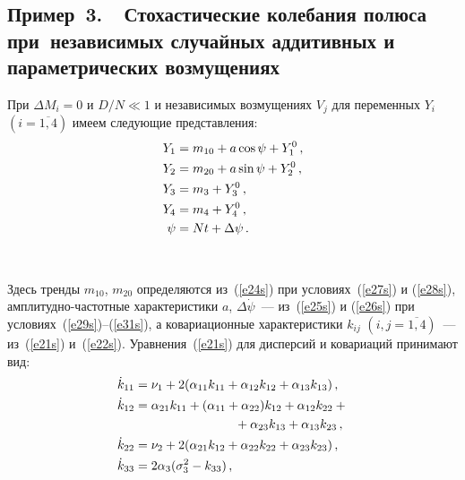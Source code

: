 \begin{multicols}{2}
\section{Пример~3.\ \ Стохастические колебания полюса при~независимых
случайных аддитивных и параметрических возмущениях}


При $\Delta M_i =0$ и $D/N \ll 1$ и независимых возмущениях
$V_j$ для переменных $Y_i$ $(i=\overline{1,4})$ имеем следующие
представления:
\begin{align}
Y_1 &= m_{10} + a \cos\psi + Y_1^0\,,\notag\\
Y_2 &= m_{20} + a \sin\psi + Y_2^0\,,\notag\\
Y_3 &= m_3 + Y_3^0\,,\notag\\
Y_4 &= m_4 + Y_4^0\,,\notag\\
\psi &= Nt +\Delta \psi\,.\label{e45s}
\end{align}
\begin{figure*} %
\vspace*{1pt}
\begin{center}
\mbox{%
\epsfxsize=164.416mm
}
\end{center}
\vspace*{-9pt}
\end{figure*}
Здесь тренды $m_{10}$, $m_{20}$ определяются из~(\ref{e24s}) при условиях~(\ref{e27s})
 и (\ref{e28s}), амплитудно-частотные характеристики $a$, $\Delta \dot \psi$~--- 
 из~(\ref{e25s}) и (\ref{e26s}) при условиях~(\ref{e29s})--(\ref{e31s}), а ковариационные
характеристики $k_{ij}$ $(i,j=\overline{1,4})$~--- из~(\ref{e21s}) и~(\ref{e22s}).
Уравнения~(\ref{e21s}) для дисперсий и ковариаций принимают вид:
\begin{align}
 \dot k_{11} & = \nu_1 + 2( \alp_{11} k_{11} +\alp_{12} k_{12}
 + \alp_{13} k_{13})\,,\notag\\
 \dot k_{12} & = \alp_{21} k_{11} +(\alp_{11}+\alp_{22}) k_{12}
 + \alp_{12} k_{22}  +{}\notag\\
 &\qquad\qquad\qquad\qquad+\alp_{23} k_{13}+\alp_{13} k_{23}\,,\notag\\
 \dot k_{22} & = \nu_2 + 2( \alp_{21} k_{12} +\alp_{22} k_{22}
 + \alp_{23} k_{23})\,,\notag\\
 \dot k_{33} & = 2 \alp_{3} (\si_3^2 -k_{33})\,,\notag\\

\end{align}
\end{multicols}
